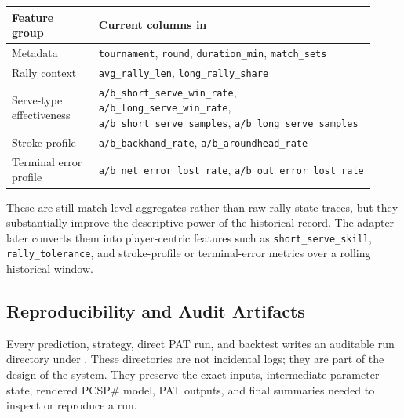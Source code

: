 \documentclass{article}
\begin{document}
\begin{table}[H]
\centering
\small
\begin{tabular}{L{0.22\linewidth}L{0.70\linewidth}}
\toprule
Feature group & Current columns in  \\
\midrule
Metadata & \texttt{tournament}, \texttt{round}, \texttt{duration\_min}, \texttt{match\_sets} \\
Rally context & \texttt{avg\_rally\_len}, \texttt{long\_rally\_share} \\
Serve-type effectiveness & \texttt{a/b\_short\_serve\_win\_rate}, \texttt{a/b\_long\_serve\_win\_rate}, \texttt{a/b\_short\_serve\_samples}, \texttt{a/b\_long\_serve\_samples} \\
Stroke profile & \texttt{a/b\_backhand\_rate}, \texttt{a/b\_aroundhead\_rate} \\
Terminal error profile & \texttt{a/b\_net\_error\_lost\_rate}, \texttt{a/b\_out\_error\_lost\_rate} \\
\bottomrule
\end{tabular}
\end{table}

These are still match-level aggregates rather than raw rally-state traces, but they substantially improve the descriptive power of the historical record. The adapter later converts them into player-centric features such as \texttt{short\_serve\_skill}, \texttt{rally\_tolerance}, and stroke-profile or terminal-error metrics over a rolling historical window.

\subsection*{Reproducibility and Audit Artifacts}
Every prediction, strategy, direct PAT run, and backtest writes an auditable run directory under . These directories are not incidental logs; they are part of the design of the system. They preserve the exact inputs, intermediate parameter state, rendered PCSP\# model, PAT outputs, and final summaries needed to inspect or reproduce a run.
\end{document}

